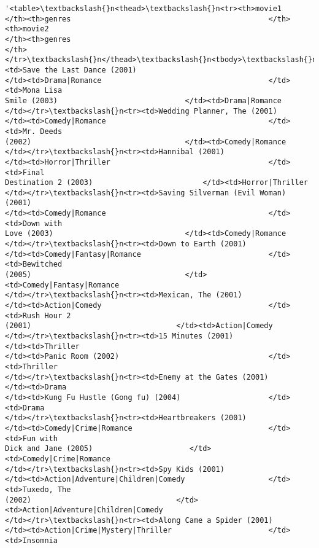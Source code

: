 \documentclass[11pt]{article}
\makeatletter
\newcommand{\boxspacing}{\kern\kvtcb@left@rule\kern\kvtcb@boxsep}
\newcommand{\prompt}[4]{
        \ttfamily\llap{{\color{#2}[#3]:\hspace{3pt}#4}}\vspace{-\baselineskip}
    }
\makeatother
\begin{document}
            \begin{tcolorbox}[breakable, size=fbox, boxrule=.5pt, pad at break*=1mm, opacityfill=0]
\prompt{Out}{outcolor}{24}{\boxspacing}
\begin{Verbatim}[commandchars=\\\{\}]
'<table>\textbackslash{}n<thead>\textbackslash{}n<tr><th>movie1
</th><th>genres                                             </th><th>movie2
</th><th>genres
</th></tr>\textbackslash{}n</thead>\textbackslash{}n<tbody>\textbackslash{}n<tr><td>Save the Last Dance (2001)
</td><td>Drama|Romance                                      </td><td>Mona Lisa
Smile (2003)                             </td><td>Drama|Romance
</td></tr>\textbackslash{}n<tr><td>Wedding Planner, The (2001)
</td><td>Comedy|Romance                                     </td><td>Mr. Deeds
(2002)                                   </td><td>Comedy|Romance
</td></tr>\textbackslash{}n<tr><td>Hannibal (2001)
</td><td>Horror|Thriller                                    </td><td>Final
Destination 2 (2003)                         </td><td>Horror|Thriller
</td></tr>\textbackslash{}n<tr><td>Saving Silverman (Evil Woman) (2001)
</td><td>Comedy|Romance                                     </td><td>Down with
Love (2003)                              </td><td>Comedy|Romance
</td></tr>\textbackslash{}n<tr><td>Down to Earth (2001)
</td><td>Comedy|Fantasy|Romance                             </td><td>Bewitched
(2005)                                   </td><td>Comedy|Fantasy|Romance
</td></tr>\textbackslash{}n<tr><td>Mexican, The (2001)
</td><td>Action|Comedy                                      </td><td>Rush Hour 2
(2001)                                 </td><td>Action|Comedy
</td></tr>\textbackslash{}n<tr><td>15 Minutes (2001)                       </td><td>Thriller
</td><td>Panic Room (2002)                                  </td><td>Thriller
</td></tr>\textbackslash{}n<tr><td>Enemy at the Gates (2001)               </td><td>Drama
</td><td>Kung Fu Hustle (Gong fu) (2004)                    </td><td>Drama
</td></tr>\textbackslash{}n<tr><td>Heartbreakers (2001)
</td><td>Comedy|Crime|Romance                               </td><td>Fun with
Dick and Jane (2005)                      </td><td>Comedy|Crime|Romance
</td></tr>\textbackslash{}n<tr><td>Spy Kids (2001)
</td><td>Action|Adventure|Children|Comedy                   </td><td>Tuxedo, The
(2002)                                 </td><td>Action|Adventure|Children|Comedy
</td></tr>\textbackslash{}n<tr><td>Along Came a Spider (2001)
</td><td>Action|Crime|Mystery|Thriller                      </td><td>Insomnia

\end{Verbatim}
\end{tcolorbox}
\end{document}
